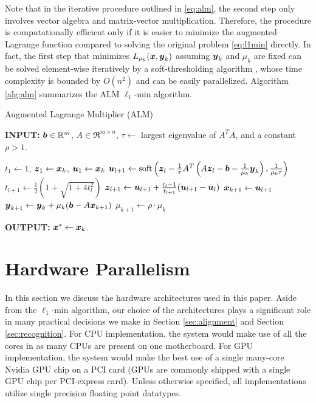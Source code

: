 \documentclass[10pt,twocolumn,letterpaper]{article}
\begin{document}
Note that in the iterative procedure outlined in \eqref{eq:alm}, the second step only involves vector algebra and matrix-vector multiplication. Therefore, the procedure is computationally efficient only if it is easier to minimize the augmented Lagrange function compared to solving the original problem \eqref{eq:l1min} directly. In fact, the first step that minimizes $L_{\mu_k} ({\boldsymbol{x}},{\boldsymbol{y}}_k)$ assuming ${\boldsymbol{y}}_k$ and $\mu_k$ are fixed can be solved element-wise iteratively by a soft-thresholding algorithm \cite{WrightS2008,BeckA2009}, whose time complexity is bounded by $O(n^2)$ and can be easily parallelized. Algorithm \ref{alg:alm} summarizes the ALM $\ell_1$-min algorithm.
 \begin{algorithm}[h]
\caption{Augmented Lagrange Multiplier (ALM)}
{\bf INPUT:} ${\boldsymbol{b}} \in {\mathbb{R}}^m$, $A \in \Re^{m \times n}$, $\tau\leftarrow$ largest eigenvalue of $A^TA$, and a constant $\rho>1$.
\begin{algorithmic}[1]
 \STATE $t_1 \leftarrow 1$, ${\boldsymbol{z}}_1
\leftarrow {\boldsymbol{x}}_k$, ${\boldsymbol{u}}_1 \leftarrow {\boldsymbol{x}}_k$  \STATE ${\boldsymbol{u}}_{l+1}  \leftarrow
\mathrm{soft}\left({\boldsymbol{z}}_l - \frac{1}{\tau}A^T\left(A{\boldsymbol{z}}_l - {\boldsymbol{b}}
- \frac{1}{\mu_k}{\boldsymbol{y}}_k\right), \frac{1}{\mu_k\tau}\right)$
\STATE $t_{l+1} \leftarrow \frac{1}{2}\left( 1 +
\sqrt{1+4t_l^2}\right)$ \STATE ${\boldsymbol{z}}_{l+1} \leftarrow {\boldsymbol{u}}_{l+1}
+ \frac{t_l - 1}{t_{l+1}}({\boldsymbol{u}}_{l+1} - {\boldsymbol{u}}_l)$ \ENDWHILE \STATE$
{\boldsymbol{x}}_{k+1} \leftarrow {\boldsymbol{u}}_{l+1}$ \STATE ${\boldsymbol{y}}_{k+1} \leftarrow
{\boldsymbol{y}}_k + \mu_k ({\boldsymbol{b}} - A{\boldsymbol{x}}_{k+1})$ \STATE $\mu_{k+1} \leftarrow
\rho\cdot\mu_k$ \ENDWHILE 
\end{algorithmic}

{\bf OUTPUT:} ${\boldsymbol{x}}^* \leftarrow {\boldsymbol{x}}_k$.
\label{alg:alm}
\end{algorithm}

\section{Hardware Parallelism}
\label{sec:parallelism}
In this section we discuss the hardware architectures used in this paper. Aside from the $\ell_1$-min algorithm, our choice
of the architectures plays a significant role in many practical decisions we make in Section \ref{sec:alignment} and Section \ref{sec:recognition}.
For CPU implementation, the system would make use of all the cores in as many CPUs are present on one motherboard.  For GPU implementation, the system would
make the best use of a single many-core Nvidia GPU chip  on a PCI card (GPUs are commonly shipped with a single GPU chip per PCI-express card).  Unless otherwise specified, all implementations utilize single
precision floating point datatypes.  
\end{document}
